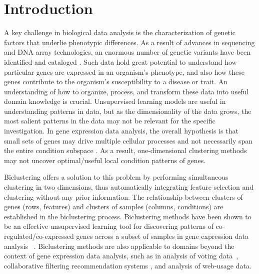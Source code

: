 \section{Introduction}
\label{sec:introduction}
A key challenge in biological data analysis is the characterization of genetic factors that underlie phenotypic differences. 
As a result of advances in sequencing and DNA array technologies, an enormous number of genetic variants have been identified and cataloged \cite{xia2015networkanalyst}.
Such data hold great potential to understand how particular genes are expressed in an organism's phenotype, and also how these genes contribute to the organism's susceptibility to a disease or trait.
An understanding of how to organize, process, and transform these data into useful domain knowledge is crucial.
Unsupervised learning models are useful in understanding patterns in data, but as the dimensionality of the data grows, the most salient patterns in the data may not be relevant for the specific investigation.
In gene expression data analysis, the overall hypothesis is that small sets of genes may drive multiple cellular processes and not necessarily span the entire condition subspace \cite{xu2011bartmap}.
As a result, one-dimensional clustering methods may not uncover optimal/useful local condition patterns of genes.

Biclustering offers a solution to this problem by performing simultaneous clustering in two dimensions, thus automatically integrating feature selection and clustering without any prior information.
The relationship between clusters of genes (rows, features) and clusters of samples (columns, conditions) are established in the biclustering process.
Biclustering methods have been shown to be an effective unsupervised learning tool for discovering patterns of co-regulated/co-expressed genes across a subset of samples in gene expression data analysis ~\cite{tanay2002discovering,madeira2004biclustering,pontes2015biclustering}.
Biclustering methods are also applicable to domains beyond the context of gene expression data analysis, such as in analysis of voting data~\cite{hartigan1972direct}, collaborative filtering recommendation systems \cite{elnabarawy2016biclustering}, and analysis of web-usage data\cite{prabha2013biclustering}.

